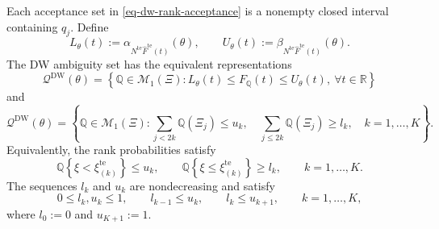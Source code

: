 \begin{proposition}
  \label{prop-finite-rank-constraints}
  Each acceptance set in \eqref{eq-dw-rank-acceptance} is a nonempty closed interval containing $q_j$. Define
  \[
    L_\theta(t):=\alpha_{N^{\mathrm{te}}\widehat F^{\mathrm{te}}(t)}(\theta),
    \qquad
    U_\theta(t):=\beta_{N^{\mathrm{te}}\widehat F^{\mathrm{te}}(t)}(\theta).
  \]
  The DW ambiguity set has the equivalent representations
  \[
    \mathcal Q^{\mathrm{DW}}(\theta)
    =\left\{\mathbb Q\in\mathcal M_1(\Xi):
      L_\theta(t)\le F_{\mathbb Q}(t)\le U_\theta(t),\ \forall t\in\mathbb R\right\}
  \]
  and
  \begin{equation}
    \mathcal Q^{\mathrm{DW}}(\theta)
    =\left\{\mathbb Q\in\mathcal M_1(\Xi):
      \sum_{j<2k}\mathbb Q(\Xi_j)\le u_k,\quad
      \sum_{j\le2k}\mathbb Q(\Xi_j)\ge l_k,\quad k=1,\ldots,K\right\}.
    \label{eq-finite-rank-constraints}
  \end{equation}
  Equivalently, the rank probabilities satisfy
  \[
    \mathbb Q\left\{\xi<\xi_{(k)}^{\mathrm{te}}\right\}\le u_k,
    \qquad
    \mathbb Q\left\{\xi\le\xi_{(k)}^{\mathrm{te}}\right\}\ge l_k,
    \qquad k=1,\ldots,K.
  \]
  The sequences $l_k$ and $u_k$ are nondecreasing and satisfy
  \[
    0\le l_k,u_k\le1,\qquad l_{k-1}\le u_k,\qquad l_k\le u_{k+1},
    \qquad k=1,\ldots,K,
  \]
  where $l_0:=0$ and $u_{K+1}:=1$.
\end{proposition}
